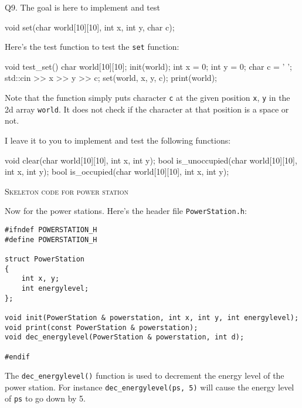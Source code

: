 Q9.
The goal is here to implement and test
\begin{console}
void set(char world[10][10], int x, int y, char c);
\end{console}

Here's the test function to test the \verb!set! function:
\begin{console}
void test_set()
{
    char world[10][10];
    init(world);
    int x = 0;
    int y = 0;
    char c = ' ';
    std::cin >> x >> y >> c;
    set(world, x, y, c);
    print(world);
}
\end{console}
Note that the function simply puts character \verb!c! at the given position
\verb!x!, \verb!y! in the 2d array \verb!world!.
It does not check if the character at that position is a space or not.

I leave it to you to implement and test the following functions:
\begin{console}[commandchars=\\\{\}]
void clear(char world[10][10], int x, int y);
bool is_unoccupied(char world[10][10], int x, int y);
bool is_occupied(char world[10][10], int x, int y);
\end{console}


  
\newpage
\textsc{Skeleton code for power station}

Now for the power stations.
Here's the header file \verb!PowerStation.h!:
\begin{Verbatim}[frame=single]
#ifndef POWERSTATION_H
#define POWERSTATION_H

struct PowerStation
{
    int x, y;
    int energylevel;
};

void init(PowerStation & powerstation, int x, int y, int energylevel);
void print(const PowerStation & powerstation);
void dec_energylevel(PowerStation & powerstation, int d);

#endif
\end{Verbatim}

The \verb!dec_energylevel()! function is used to decrement the energy level
of the power station.
For instance \verb!dec_energylevel(ps, 5)!
will cause the energy level of \verb!ps! to go down by 5.




